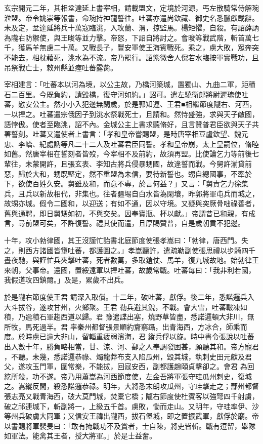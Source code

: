 \begin{pinyinscope}
 玄宗開元二年，其相坌達延上書宰相，請載盟文，定境於河源，丐左散騎常侍解琬涖盟。帝令姚崇等報書，命琬持神龍誓往。吐蕃亦遣尚欽藏、御史名悉臘獻載辭。未及定，坌達延將兵十萬寇臨洮，入攻蘭、渭，掠監馬。楊矩懼，自殺。有詔薛訥為隴右防禦使，與王晙等並力擊。帝怒，下詔自將討之。會晙等戰武階，斬首萬七千，獲馬羊無慮二十萬。又戰長子，豐安軍使王海賓戰死。乘之，虜大敗，眾奔突不能去，相枕藉死，洮水為不流。帝乃罷行。詔紫微舍人倪若水臨按軍實戰功，且吊祭戰亡士，敕州縣並瘞吐蕃露胔。



 宰相建言：「吐蕃本以河為境，以公主故，乃橋河築城，置獨山、九曲二軍，距積石二百里。今既負約，請毀橋，復守河如約。」詔可。遣左驍衛郎將尉遲瑰使吐蕃，慰安公主。然小小入犯邊無閑歲，於是郭知運、王君■相繼節度隴右、河西，一以捍之。吐蕃遣宗俄因子到洮水祭戰死士，且請和。然恃盛強，求與天子敵國，語悖傲。使者至臨洮，詔不內。金城公主上書求聽脩好，且言贊普君臣欲與天子共署誓刻。吐蕃又遣使者上書言：「孝和皇帝嘗賜盟，是時唐宰相豆盧欽望、魏元忠、李嶠、紀處訥等凡二十二人及吐蕃君臣同誓。孝和皇帝崩，太上皇嗣位，脩睦如舊。然唐宰相在誓刻者皆歿，今宰相不及前約，故須再盟。比使論乞力等前後七輩往，未蒙開許，且張玄表、李知古將兵侵暴甥國，故違誓而戰。今舅許湔貸前惡，歸於大和，甥既堅定，然不重盟為未信，要待新誓也。甥自總國事，不牽於下，欲使百姓久安。舅雖及和，而意不專，於言何益？」又言：「舅責乞力徐集兵，且兵以新故相代，非集也。往者疆埸自白水皆為閑壤，昨郭將軍屯兵而城之，故甥亦城。假令二國和，以迎送；有如不通，因以守境。又疑與突厥骨咄祿善者，舊與通聘，即日舅甥如初，不與交矣。因奉寶瓶、杯以獻。」帝謂昔已和親，有成言，尋前盟可矣，不許復誓。禮其使而遣，且厚賜贊普，自是歲朝貢不犯邊。



 十年，攻小勃律國，其王沒謹忙詒書北庭節度使張孝嵩曰：「勃律，唐西門。失之，則西方諸國皆墯吐蕃，都護圖之。」孝嵩聽許，遣疏勒副使張思禮以步騎四千晝夜馳，與謹忙兵夾擊吐蕃，死者數萬，多取鎧仗、馬羊，復九城故地。始勃律王來朝，父事帝。還國，置綏遠軍以捍吐蕃，故歲常戰。吐蕃每曰：「我非利若國，我假道攻四鎮爾。」及是，累歲不出兵。


於是隴右節度使王君
 請深入取償。十二年，破吐蕃，獻俘。後二年，悉諾邏兵入大斗拔谷，遂攻甘州，火鄉聚。王君
 勒兵避其銳，不戰。會大雪，吐蕃皸凍如積，乃逾積石軍趨西道以歸。君
 豫遣諜出塞，燒野草皆盡，悉諾邏頓大非川，無所牧，馬死過半。君
 率秦州都督張景順約齎窮躡，出青海西，方冰合，師乘而度。於時虜已逾大非山，留輜重疲弱濱海，君
 縱兵俘以旋。時中書令張說以吐蕃出入數十年，勝負略相當，甘、涼、河、鄯之人奉調發困甚，願聽其和。帝方寵君
 ，不聽。未幾，悉諾邏恭祿、燭龍莽布支入陷瓜州，毀其城，執刺史田元獻及君
 父，遂攻玉門軍，圍常樂，不能拔，回寇安西，副都護趙頤貞擊卻之。會君
 為回紇所殺，功不遂。帝乃用蕭嵩為河西節度使，左金吾將軍張守珪瓜州刺史，復城之。嵩縱反間，殺悉諾邏恭祿。明年，大將悉末朗攻瓜州，守珪擊走之；鄯州都督張志亮又戰青海西，破大莫門城，焚橐它橋；隴右節度使杜賓客以強弩四千射虜，破之祁連城下，斬副將一，上級五千首。虜敗，慟而走山。又明年，守珪率伊、沙等州兵破虜大同軍；又信安王禕出隴西，拔石堡城，即之置振武軍，獻俘於廟。帝以書賜將軍裴旻曰：「敢有掩戰功不及賞者，士自陳，將吏皆斬。戰有逗留，舉隊如軍法。能禽其王者，授大將軍。」於是士益奮。




\end{pinyinscope}
